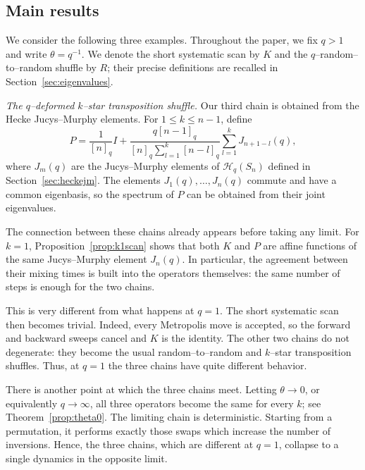 \documentclass[11pt]{article}
\theoremstyle{plain}  %
\begin{document}
\subsection{Main results}\label{sec:mainresults}

We consider the following three
examples. Throughout the paper, we fix $q>1$ and write $\theta=q^{-1}$.
We denote the short systematic scan by $K$ and the
$q$--random--to--random shuffle by $R$; their precise definitions are
recalled in Section~\ref{sec:eigenvalues}.



\emph{The $q$--deformed $k$--star transposition shuffle.}
Our third chain is obtained from the Hecke Jucys--Murphy elements. For
$1\leq k\leq n-1$, define
\begin{equation}\label{eq:Pdef}
P
=
\frac{1}{[n]_q}I
+
\frac{q[n-1]_q}
     {[n]_q\sum_{l=1}^{k}[n-l]_q}
\sum_{l=1}^{k}J_{n+1-l}(q),
\end{equation}
where $J_m(q)$ are the Jucys--Murphy elements of
$\mathcal{H}_q(S_n)$ defined in Section~\ref{sec:heckejm}.
The elements $J_1(q),\ldots,J_n(q)$ commute and have a common eigenbasis, so
the spectrum of $P$ can be obtained from their joint eigenvalues. 



The connection between these chains already appears before taking any limit.
For $k=1$, Proposition~\ref{prop:k1scan} shows that both $K$ and $P$ are affine
functions of the same Jucys--Murphy element $J_n(q)$. In particular, the
agreement between their mixing times is built into the operators themselves:
the same number of steps is enough for the two chains.

This is very different from what happens at $q=1$. The short systematic scan
then becomes trivial. Indeed, every Metropolis move is accepted, so the forward
and backward sweeps cancel and $K$ is the identity. The other two chains do not
degenerate: they become the usual random--to--random and $k$--star
transposition shuffles. Thus, at $q=1$ the three chains have quite different
behavior.


There is another point at which the three chains meet. Letting
$\theta\to0$, or equivalently $q\to\infty$, all three operators become the
same for every $k$; see Theorem~\ref{prop:theta0}. The limiting chain is
deterministic. Starting from a permutation, it performs exactly those swaps
which increase the number of inversions. Hence, the three chains, which are
different at $q=1$, collapse to a single dynamics in the opposite limit.
\end{document}
